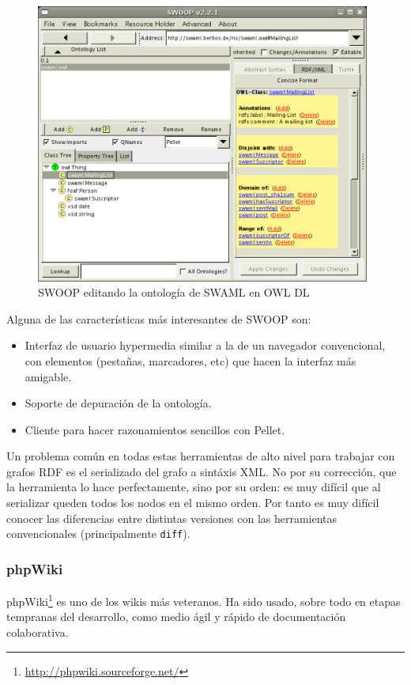 \begin{figure}[ht]
	\centering
	\includegraphics[width=11cm]{images/screenshots/swoop.png}
	\caption{SWOOP editando la ontología de SWAML en OWL DL}
	\label{fig:evoWeb}
\end{figure}

Alguna de las características más interesantes de SWOOP son:

\begin{itemize}
  \item Interfaz de usuario hypermedia similar a la de un navegador convencional, 
	con elementos (pestañas, marcadores, etc) que hacen la interfaz más 
	amigable.
  \item Soporte de depuración de la ontología.
  \item Cliente para hacer razonamientos sencillos con Pellet.
\end{itemize}

Un problema común en todas estas herramientas de alto nivel para trabajar con
grafos RDF es el serializado del grafo a sintáxis XML. No por su corrección,
que la herramienta lo hace perfectamente, sino por su orden: es muy difícil
que al serializar queden todos los nodos en el mismo orden. Por tanto es muy
difícil conocer las diferencias entre distintas versiones con las herramientas
convencionales (principalmente \texttt{diff}).

\subsubsection{phpWiki}

phpWiki\footnote{\url{http://phpwiki.sourceforge.net/}} es uno de los wikis
más veteranos. Ha sido usado, sobre todo en etapas tempranas del desarrollo, 
como medio ágil y rápido de documentación colaborativa.

